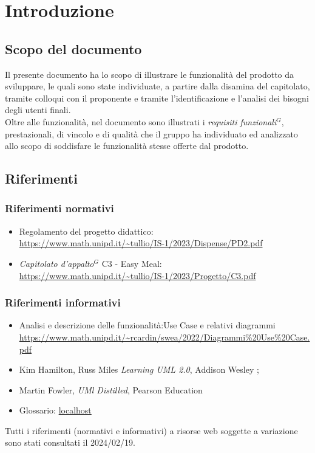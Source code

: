
\section{Introduzione}

\subsection{Scopo del documento}

Il presente documento ha lo scopo di illustrare le funzionalità del prodotto da sviluppare,
le quali sono state individuate, a partire dalla disamina del capitolato, tramite colloqui con
il proponente e tramite l'identificazione e l'analisi dei bisogni degli utenti finali.\\
Oltre alle funzionalità, nel documento sono illustrati i \emph{requisiti funzionali}$^{G}$, prestazionali, di
vincolo e di qualità che il gruppo ha individuato ed analizzato allo scopo di soddisfare le
funzionalità stesse offerte dal prodotto.

\subsection{Riferimenti}
\subsubsection{Riferimenti normativi}

\begin{itemize}
    \item Regolamento del progetto didattico: \\
    \url{https://www.math.unipd.it/~tullio/IS-1/2023/Dispense/PD2.pdf}
  \item \emph{Capitolato d’appalto}$^{G}$ C3 - Easy Meal: \\
    \url{https://www.math.unipd.it/~tullio/IS-1/2023/Progetto/C3.pdf}
\end{itemize}

\subsubsection{Riferimenti informativi}

\begin{itemize}
    \item Analisi e descrizione delle funzionalità:Use Case e relativi diagrammi \url{https://www.math.unipd.it/~rcardin/swea/2022/Diagrammi%20Use%20Case.pdf}
    \item Kim Hamilton, Russ Miles \emph{Learning UML 2.0}, Addison Wesley ;
    \item Martin Fowler, \emph{UMl Distilled}, Pearson Education
    \item Glossario: \url{localhost} %

\end{itemize}

Tutti i riferimenti (normativi e informativi) a risorse web soggette a variazione sono stati consultati il 2024/02/19.
